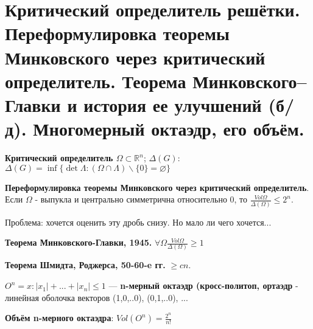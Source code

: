 \setcounter{section}{74}
\section{Критический определитель решётки. Переформулировка теоремы Минковского через критический определитель. Теорема Минковского–Главки и история ее улучшений (б/д). Многомерный октаэдр, его объём.}
\textbf{Критический определитель $\Omega \subset \mathbb{R}^n$}; $\Delta(G)$: $\Delta(G) = \inf\{\det \Lambda:(\Omega \cap \Lambda)\backslash \{0\} = \varnothing\}$ \par
\textbf{Переформулировка теоремы Минковского через критический определитель}. Если $\Omega$ - выпукла и центрально симметрична относительно 0, то $\frac{Vol \Omega}{\Delta(\Omega)} \leqslant 2^n$. \par
Проблема: хочется оценить эту дробь снизу. Но мало ли чего хочется... \par
\textbf{Теорема Минковского-Главки, 1945.} $\forall \Omega \frac{Vol \Omega}{\Delta(\Omega)} \geqslant 1$

\textbf{Теорема Шмидта, Роджерса, 50-60-e гг.} $\geqslant cn$. \par
$O^n = {x : |x_1| + . . . + |x_n| \leqslant 1}$ — \textbf{n-мерный октаэдр (кросс-политоп, ортаэдр} - линейная оболочка векторов (1,0,..0), (0,1,..0), ... \par
\textbf{Объём n-мерного октаэдра}: $Vol(O^n) = \frac{2^n}{n!}$